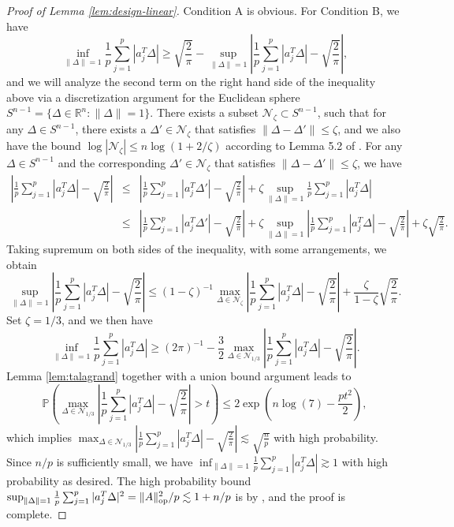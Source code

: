 \begin{proof}[Proof of Lemma \ref{lem:design-linear}]
Condition A is obvious. For Condition B, we have
$$
\inf_{\|\Delta\|=1}\frac{1}{p}\sum_{j=1}^p|a_j^T\Delta| \geq \sqrt{\frac{2}{\pi}} - \sup_{\|\Delta\|=1}\left|\frac{1}{p}\sum_{j=1}^p|a_j^T\Delta| - \sqrt{\frac{2}{\pi}} \right|,
$$
and we will analyze the second term on the right hand side of the inequality above via a discretization argument for the Euclidean sphere $S^{n-1}=\{\Delta\in\mathbb{R}^n: \|\Delta\|=1\}$. There exists a subset $\mathcal{N}_{\zeta}\subset S^{n-1}$, such that for any $\Delta\in S^{n-1}$, there exists a $\Delta'\in\mathcal{N}_{\zeta}$ that satisfies $\|\Delta-\Delta'\|\leq\zeta$, and we also have the bound $\log|\mathcal{N}_{\zeta}|\leq n\log\left(1+2/\zeta\right)$ according to Lemma 5.2 of \cite{vershynin2010introduction}. For any $\Delta\in S^{n-1}$ and the corresponding $\Delta'\in\mathcal{N}_{\zeta}$ that satisfies $\|\Delta-\Delta'\|\leq \zeta$, we have
\begin{eqnarray*}
\left|\frac{1}{p}\sum_{j=1}^p|a_j^T\Delta| - \sqrt{\frac{2}{\pi}} \right| &\leq& \left|\frac{1}{p}\sum_{j=1}^p|a_j^T\Delta'| - \sqrt{\frac{2}{\pi}} \right|  + \zeta\sup_{\|\Delta\|=1}\frac{1}{p}\sum_{j=1}^p|a_j^T\Delta| \\
&\leq& \left|\frac{1}{p}\sum_{j=1}^p|a_j^T\Delta'| - \sqrt{\frac{2}{\pi}} \right| + \zeta\sup_{\|\Delta\|=1}\left|\frac{1}{p}\sum_{j=1}^p|a_j^T\Delta| - \sqrt{\frac{2}{\pi}} \right| + \zeta\sqrt{\frac{2}{\pi}}.
\end{eqnarray*}
Taking supremum on both sides of the inequality, with some arrangements, we obtain
$$\sup_{\|\Delta\|=1}\left|\frac{1}{p}\sum_{j=1}^p|a_j^T\Delta| - \sqrt{\frac{2}{\pi}} \right|\leq (1-\zeta)^{-1}\max_{\Delta\in\mathcal{N}_{\zeta}}\left|\frac{1}{p}\sum_{j=1}^p|a_j^T\Delta| - \sqrt{\frac{2}{\pi}} \right| + \frac{\zeta}{1-\zeta}\sqrt{\frac{2}{\pi}}.$$
Set $\zeta=1/3$, and we then have
$$\inf_{\|\Delta\|=1}\frac{1}{p}\sum_{j=1}^p|a_j^T\Delta| \geq (2\pi)^{-1} - \frac{3}{2}\max_{\Delta\in\mathcal{N}_{1/3}}\left|\frac{1}{p}\sum_{j=1}^p|a_j^T\Delta| - \sqrt{\frac{2}{\pi}} \right|.$$
Lemma \ref{lem:talagrand} together with a union bound argument leads to
$$\mathbb{P}\left(\max_{\Delta\in\mathcal{N}_{1/3}}\left|\frac{1}{p}\sum_{j=1}^p|a_j^T\Delta| - \sqrt{\frac{2}{\pi}} \right|>t\right)\leq 2\exp\left(n\log(7)-\frac{pt^2}{2}\right),$$
which implies $\max_{\Delta\in\mathcal{N}_{1/3}}\left|\frac{1}{p}\sum_{j=1}^p|a_j^T\Delta| - \sqrt{\frac{2}{\pi}} \right|\lesssim \sqrt{\frac{n}{p}}$ with high probability. Since $n/p$ is sufficiently small, we have $\inf_{\|\Delta\|=1}\frac{1}{p}\sum_{j=1}^p|a_j^T\Delta|\gtrsim 1$ with high probability as desired. The high probability bound $\sup_{\|\Delta\|=1}\frac{1}{p}\sum_{j=1}^p|a_j^T\Delta|^2=\|A\|_{\rm op}^2/p\lesssim 1+n/p$ is by \cite{davidson2001local}, and the proof is complete.
\end{proof}

